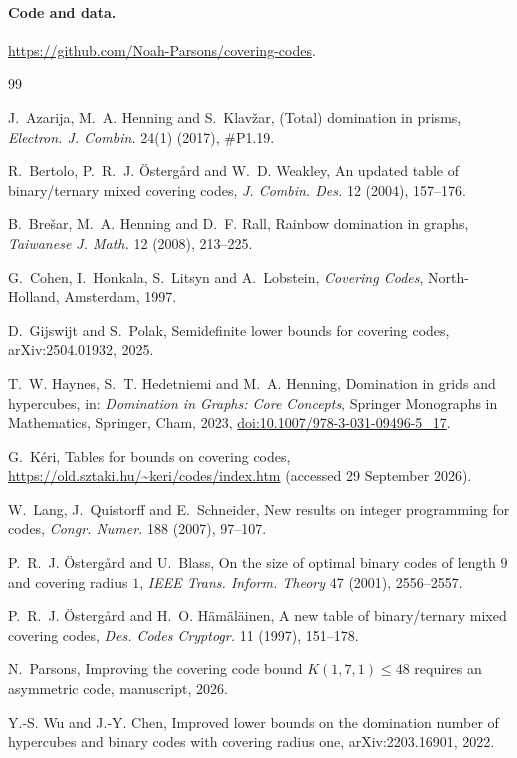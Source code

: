 \documentclass[11pt]{article}
\theoremstyle{definition}
\theoremstyle{remark}
\begin{document}
\paragraph{Code and data.} \url{https://github.com/Noah-Parsons/covering-codes}.

\begin{thebibliography}{99}

 J.~Azarija, M.~A. Henning and S.~Klavžar, (Total) domination in prisms,
\emph{Electron. J. Combin.} 24(1) (2017), \#P1.19.

 R.~Bertolo, P.~R.~J. Östergård and W.~D. Weakley, An updated table of
binary/ternary mixed covering codes, \emph{J. Combin. Des.} 12 (2004), 157--176.

 B.~Brešar, M.~A. Henning and D.~F. Rall, Rainbow domination in graphs,
\emph{Taiwanese J. Math.} 12 (2008), 213--225.

 G.~Cohen, I.~Honkala, S.~Litsyn and A.~Lobstein, \emph{Covering Codes},
North-Holland, Amsterdam, 1997.

 D.~Gijswijt and S.~Polak, Semidefinite lower bounds for covering codes,
arXiv:2504.01932, 2025.

 T.~W. Haynes, S.~T. Hedetniemi and M.~A. Henning, Domination in grids and
hypercubes, in: \emph{Domination in Graphs: Core Concepts}, Springer Monographs in Mathematics,
Springer, Cham, 2023, \href{https://doi.org/10.1007/978-3-031-09496-5_17}{doi:10.1007/978-3-031-09496-5\_17}.

 G.~Kéri, Tables for bounds on covering codes,
\url{https://old.sztaki.hu/~keri/codes/index.htm} (accessed 29 September 2026).

 W.~Lang, J.~Quistorff and E.~Schneider, New results on integer programming for
codes, \emph{Congr. Numer.} 188 (2007), 97--107.

 P.~R.~J. Östergård and U.~Blass, On the size of optimal binary codes of length $9$
and covering radius $1$, \emph{IEEE Trans. Inform. Theory} 47 (2001), 2556--2557.

 P.~R.~J. Östergård and H.~O. Hämäläinen, A new table of binary/ternary mixed
covering codes, \emph{Des. Codes Cryptogr.} 11 (1997), 151--178.

 N.~Parsons, Improving the covering code bound $K(1,7,1)\le 48$ requires an
asymmetric code, manuscript, 2026.

 Y.-S. Wu and J.-Y. Chen, Improved lower bounds on the domination number of
hypercubes and binary codes with covering radius one, arXiv:2203.16901, 2022.


\end{thebibliography}
\end{document}
